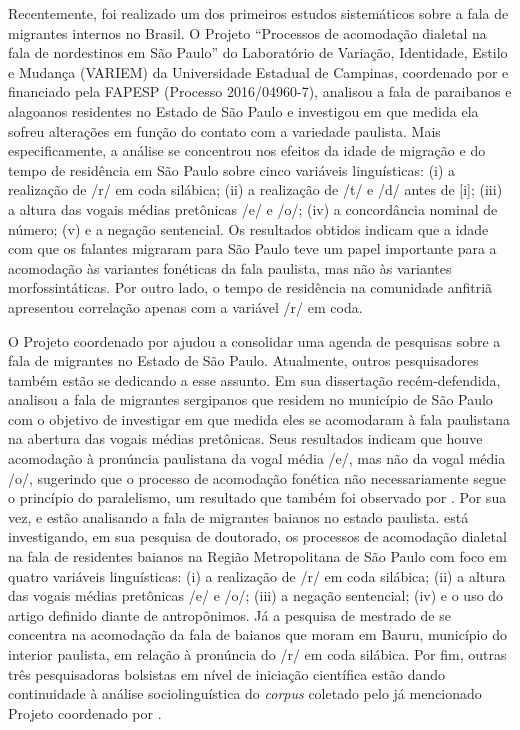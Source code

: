 \documentclass[
	a4paper,	%
	12pt,		%
	]{article}	%
\begin{document}
Recentemente, foi realizado um dos primeiros estudos sistemáticos sobre a fala
de migrantes internos no Brasil. O Projeto \enquote{Processos de acomodação
dialetal na fala de nordestinos em São Paulo} do Laboratório de Variação,
Identidade, Estilo e Mudança (VARIEM) da Universidade Estadual de Campinas,
coordenado por \citet{Oushiro2018} e financiado pela FAPESP (Processo
2016/04960-7), analisou a fala de paraibanos e alagoanos residentes no Estado de
São Paulo e investigou em que medida ela sofreu alterações em função do contato
com a variedade paulista.  Mais especificamente, a análise se concentrou nos
efeitos da idade de migração e do tempo de residência em São Paulo sobre cinco
variáveis linguísticas: (i) a realização de /r/ em coda silábica; (ii) a
realização de /t/ e /d/ antes de [i]; (iii) a altura das vogais médias
pretônicas /e/ e /o/; (iv) a concordância nominal de número; (v) e a negação
sentencial. Os resultados obtidos indicam que a idade com que os falantes
migraram para São Paulo teve um papel importante para a acomodação às variantes
fonéticas da fala paulista, mas não às variantes morfossintáticas. Por outro
lado, o tempo de residência na comunidade anfitriã apresentou correlação apenas
com a variável /r/ em coda.

O Projeto coordenado por \citet{Oushiro2018} ajudou a consolidar uma agenda
de pesquisas sobre a fala de migrantes no Estado de São Paulo. Atualmente,
outros pesquisadores também estão se dedicando a esse assunto. Em sua
dissertação recém-defendida, \citet{Santana2019} analisou a fala de
migrantes sergipanos que residem no município de São Paulo com o objetivo de
investigar em que medida eles se acomodaram à fala paulistana na abertura
das vogais médias pretônicas.  Seus resultados indicam que houve acomodação
à pronúncia paulistana da vogal média /e/, mas não da vogal média /o/,
sugerindo que o processo de acomodação fonética não necessariamente segue o
princípio do paralelismo, um resultado que também foi observado por
\citet{Oushiro2018}. Por sua vez, \citet{Souza2017} e \citet{Oliveira2019}
estão analisando a fala de migrantes baianos no estado paulista.
\citet{Souza2017} está investigando, em sua pesquisa de doutorado, os
processos de acomodação dialetal na fala de residentes baianos na Região
Metropolitana de São Paulo com foco em quatro variáveis linguísticas: (i) a
realização de /r/ em coda silábica; (ii) a altura das vogais médias
pretônicas /e/ e /o/; (iii) a negação sentencial; (iv) e o uso do artigo
definido diante de antropônimos. Já a pesquisa de mestrado de
\citet{Oliveira2019} se concentra na acomodação da fala de baianos que moram
em Bauru, município do interior paulista, em relação à pronúncia do /r/ em
coda silábica. Por fim, outras três pesquisadoras bolsistas em nível de
iniciação científica estão dando continuidade à análise sociolinguística do
\emph{corpus} coletado pelo já mencionado Projeto coordenado por
\citet{Oushiro2018}.
\end{document}
